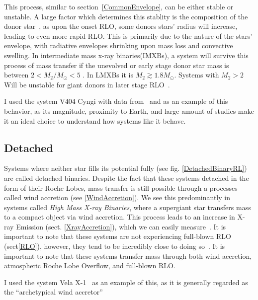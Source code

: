 \documentclass[12pt, a4paper]{article}
\begin{document}
        This process, similar to section~\ref{CommonEnvelope}, can be either stable or unstable. A large factor which determines this stablity is the composition of the donor star~\cite{TaurisvandenHeuvel+2023}, as upon the onset RLO, some donors stars' radius will increase, leading to even more rapid RLO. This is primarily due to the nature of the stars' envelope, with radiative envelopes shrinking upon mass loss and convective swelling. \cite{TaurisvandenHeuvel+2023} In intermediate mass x-ray binaries(IMXBs), a system will survive this process of mass transfer if the unevolved or early stage donor star mass is between $2 < M_2/M_\odot < 5$ \cite{TaurisvandenHeuvel+2023}. In LMXBs it is $M_2 \gtrsim 1.8 M_\odot$. Systems with $M_2 > 2$ Will be unstable for giant donors in later stage RLO~\cite{TaurisvandenHeuvel+2023}.
        
        I used the system V404 Cyngi with data from~\cite{Bernardini_2016} and \cite{Shahbaz_1994} as an example of this behavior, as its magnitude, proximity to Earth, and large amount of studies make it an ideal choice to understand how systems like it behave. 

        \subsection{\centering Detached}\label{DetachedBinary}

        Systems where neither star fills its potential fully (see fig. \ref{DetachedBinaryRL}) are called detached binaries. Despite the fact that these systems detached in the form of their Roche Lobes, mass transfer is still possible through a processes called wind accretion (see \ref{WindAccretion}). We see this predominantly in systems called \textit{High Mass X-ray Binaries}, where a supergiant star transfers mass to a compact object via wind accretion. This process leads to an increase in X-ray Emission (sect. \ref{XrayAccretion}), which we can easily measure~\cite{TaurisvandenHeuvel+2023}. It is important to note that these systems are not experiencing full-blown RLO (sect\ref{RLO}), however, they tend to be incredibly close to doing so~\cite{TaurisvandenHeuvel+2023}. It is important to note that these systems transfer mass through both wind accretion, atmospheric Roche Lobe Overflow, and full-blown RLO.

        I used the system Vela X-1~\cite{Kretschmar_2021} as an example of this, as it is generally regarded as the ``archetypical wind accretor''~\cite{Kretschmar_2021} 
\end{document}
